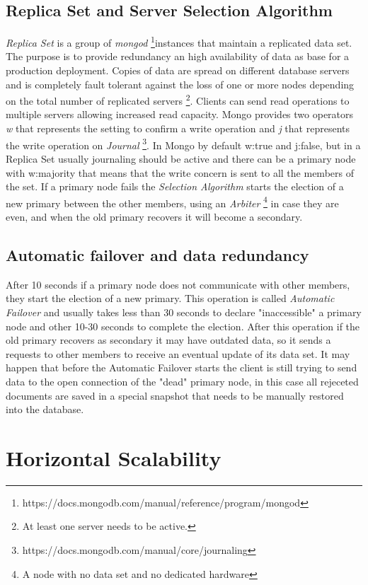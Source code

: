 \subsection{Replica Set and Server Selection Algorithm}
\textit{Replica Set} is a group of \textit{mongod} \footnote{https://docs.mongodb.com/manual/reference/program/mongod}instances that maintain a replicated data set. The purpose is to provide redundancy an high availability of data as base for a production deployment. Copies of data are spread on different database servers and is completely fault tolerant against the loss of one or more nodes depending on the total number of replicated servers \footnote{At least one server needs to be active.}.
Clients can send read operations to multiple servers allowing increased read capacity. Mongo provides two operators \textit{w} that represents the setting to confirm a write operation and \textit{j} that represents the write operation on \textit{Journal} \footnote{https://docs.mongodb.com/manual/core/journaling}.
In Mongo by default w:true and j:false, but in a Replica Set  usually journaling should be active and there can be a primary node with w:majority that means that the write concern is sent to all the members of the set.
If a primary node fails the \textit{Selection Algorithm} starts the election of  a new primary between the other members, using an \textit{Arbiter} \footnote{A node with no data set and no dedicated hardware} in case they are even, and when the old primary recovers it will become a secondary.

\subsection{Automatic failover and data redundancy}
After 10 seconds if a primary node does not communicate with other members, they start the election of a new primary. This operation is called \textit{Automatic Failover} and usually takes less than 30 seconds to declare "inaccessible" a primary node and other 10-30 seconds to complete the election.
After this operation if the old primary recovers as secondary it may have outdated data, so it sends a requests to other members to receive an eventual update of its data set.
It may happen that before the Automatic Failover starts the client is still trying to send data to the open connection of the "dead" primary node, in this case all rejeceted documents are saved in a special snapshot that needs to be manually restored into the database.

\section{Horizontal Scalability}
\label{sec:6}

